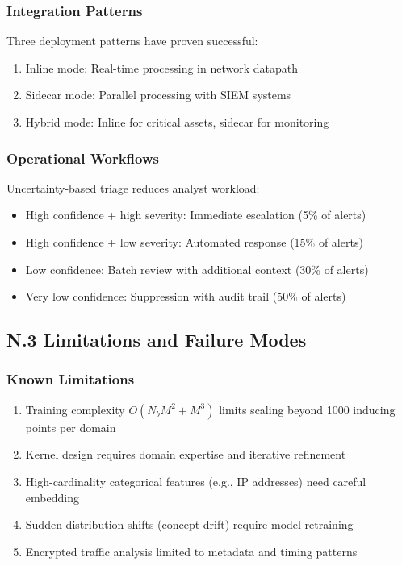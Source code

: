 \documentclass[12pt]{article}
\begin{document}
\subsubsection{Integration Patterns}
Three deployment patterns have proven successful:
\begin{enumerate}
\item Inline mode: Real-time processing in network datapath
\item Sidecar mode: Parallel processing with SIEM systems
\item Hybrid mode: Inline for critical assets, sidecar for monitoring
\end{enumerate}

\subsubsection{Operational Workflows}
Uncertainty-based triage reduces analyst workload:
\begin{itemize}
\item High confidence + high severity: Immediate escalation (5\% of alerts)
\item High confidence + low severity: Automated response (15\% of alerts)
\item Low confidence: Batch review with additional context (30\% of alerts)
\item Very low confidence: Suppression with audit trail (50\% of alerts)
\end{itemize}

\subsection{N.3 Limitations and Failure Modes}

\subsubsection{Known Limitations}
\begin{enumerate}
\item Training complexity $O(N_b M^2 + M^3)$ limits scaling beyond 1000 inducing points per domain
\item Kernel design requires domain expertise and iterative refinement
\item High-cardinality categorical features (e.g., IP addresses) need careful embedding
\item Sudden distribution shifts (concept drift) require model retraining
\item Encrypted traffic analysis limited to metadata and timing patterns
\end{enumerate}
\end{document}
